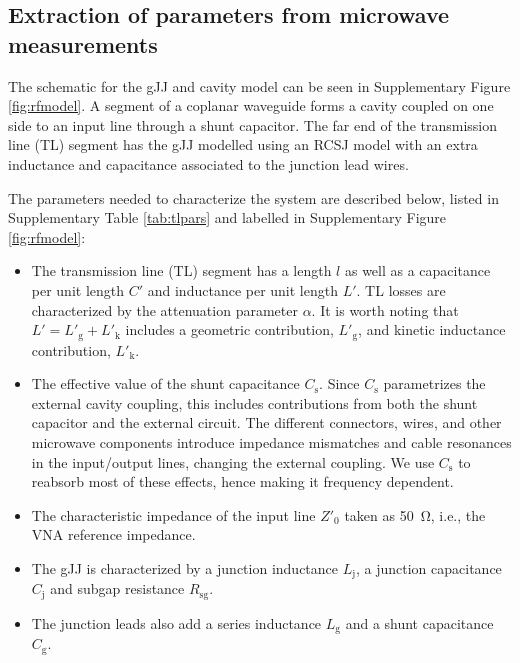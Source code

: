 \subsection{Extraction of parameters from microwave measurements}\label{sec:extraction}
\noindent The schematic for the gJJ and cavity model can be seen in Supplementary Figure \ref{fig:rfmodel}.
A segment of a coplanar waveguide forms a cavity coupled on one side to an input line through a shunt capacitor.
The far end of the transmission line (TL) segment has the gJJ modelled using an RCSJ model with an extra inductance and capacitance associated to the junction lead wires.

The parameters needed to characterize the system are described below, listed in Supplementary Table \ref{tab:tlpars} and labelled in Supplementary Figure \ref{fig:rfmodel}:
\begin{itemize}
	\item The transmission line (TL) segment has a length $l$ as well as a capacitance per unit length $C'$ and inductance per unit length $L'$.
	TL losses are characterized by the attenuation parameter $\alpha$.
	It is worth noting that $L' = L'_\text{g} + L'_\text{k}$ includes a geometric contribution, $L'_\text{g}$, and kinetic inductance contribution\cite{vanduzerPrinciplesSuperconductiveDevices1999}, $L'_\text{k}$.
	\item The effective value of the shunt capacitance $C_\text{s}$.
	Since $C_\text{s}$ parametrizes the external cavity coupling, this includes contributions from both the shunt capacitor and the external circuit.
	The different connectors, wires, and other microwave components introduce impedance mismatches and cable resonances in the input/output lines, changing the external coupling.
	We use $C_\text{s}$ to reabsorb most of these effects, hence making it frequency dependent.
	\item The characteristic impedance of the input line $Z'_0$ taken as \SI{50}{\ohm}, i.e., the VNA reference impedance.
	\item The gJJ is characterized by a junction inductance $L_\text{j}$, a junction capacitance $C_\text{j}$ and subgap resistance $R_\text{sg}$.
	\item The junction leads also add a series inductance $L_\text{g}$ and a shunt capacitance $C_\text{g}$.
\end{itemize}

